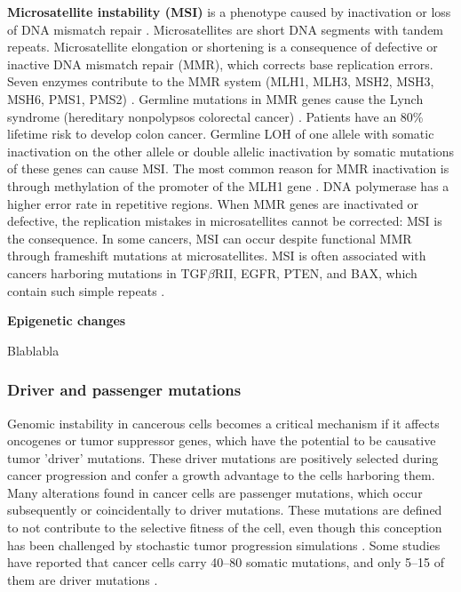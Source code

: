       \textbf{Microsatellite instability (MSI)} is a phenotype caused by
      inactivation or loss of DNA mismatch repair {\cite{msi}}. Microsatellites
      are short DNA segments with tandem repeats. Microsatellite elongation or
      shortening is a consequence of defective or inactive DNA mismatch repair
      (MMR), which corrects base replication errors. Seven enzymes contribute to
      the MMR system (MLH1, MLH3, MSH2, MSH3, MSH6, PMS1, PMS2)
      {\cite{cin_crc}}. Germline mutations in MMR genes cause the Lynch syndrome
      (hereditary nonpolypsos colorectal cancer) {\cite{lynch}}. Patients have
      an 80\% lifetime risk to develop colon cancer. Germline LOH of one allele
      with somatic inactivation on the other allele or double allelic
      inactivation by somatic mutations of these genes can cause MSI. The most
      common reason for MMR inactivation is through methylation of the promoter
      of the MLH1 gene {\cite{lynch_2}}. DNA polymerase has a higher error rate
      in repetitive regions. When MMR genes are inactivated or defective, the
      replication mistakes in microsatellites cannot be corrected: MSI is the
      consequence. In some cancers, MSI can occur despite functional MMR through
      frameshift mutations at microsatellites. MSI is often associated with
      cancers harboring mutations in TGF$\beta$RII, EGFR, PTEN, and BAX, which
      contain such simple repeats {\cite{micro}}.

      \textbf{Epigenetic changes}

      Blablabla

    \subsubsection{Driver and passenger mutations}

      Genomic instability in cancerous cells becomes a critical mechanism if it
      affects oncogenes or tumor suppressor genes, which have the potential to
      be causative tumor 'driver' mutations. These driver mutations are
      positively selected during cancer progression and confer a growth
      advantage to the cells harboring them. Many alterations found in cancer
      cells are passenger mutations, which occur subsequently or coincidentally
      to driver mutations. These mutations are defined to not contribute to the
      selective fitness of the cell, even though this conception has been
      challenged by stochastic tumor progression simulations
      {\cite{stochastic_cancer}}. Some studies have reported that cancer cells
      carry 40--80 somatic mutations, and only 5--15 of them are driver
      mutations {\cite{som_mut}}.

